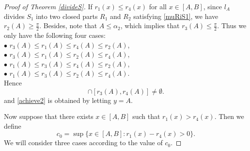 \documentclass[oneside,english,a4wide]{amsart}
\numberwithin{equation}{section}
\numberwithin{figure}{section}
\theoremstyle{plain}
\theoremstyle{plain}
\theoremstyle{definition}
\theoremstyle{plain}
\theoremstyle{remark}
\theoremstyle{definition}
\theoremstyle{remark}
\theoremstyle{definition}
\newcommand{\8}{\infty}
\begin{document}
\begin{proof}[Proof of Theorem \ref{divideS}]
	If $r_1(x)\le r_4(x)$ for all $x\in [A,B]$, since $l_A$ divides $S_1$ into two closed parts $R_{1}$ and $R_{2}$ satisfying \eqref{muRiS1}, we have $r_2(A)\ge \frac{\pi}{2}$. Besides, note that $A\le \alpha_2$, which implies that $r_3(A)\le \frac{\pi}{2}$. Thus we only have the following four cases:\\
	$\bullet$ $r_3(A)\le r_1(A)\le r_4(A)\le r_2(A)$,\\
	$\bullet$ $r_3(A)\le r_1(A)\le r_2(A)\le r_4(A)$,\\
	$\bullet$ $r_1(A)\le r_3(A)\le r_4(A)\le r_2(A)$,\\
	$\bullet$ $r_1(A)\le r_3(A)\le r_2(A)\le r_4(A)$.\\
	Hence
	\begin{equation*}
		[r_1(A),r_2(A)]\cap [r_3(A),r_4(A)]\neq \emptyset.
	\end{equation*}
    and \eqref{achieve2} is obtained by letting $y=A$.
    
	Now suppose that there exists $x\in [A, B]$ such that $r_1(x)>r_4(x)$.  Then we define 
	\begin{equation*}
		c_0=\sup\{x\in [A,B]:r_1(x)-r_4(x)>0\}.
	\end{equation*}
	We will consider three cases according to the value of $c_0$.
	

\end{proof}
\end{document}
